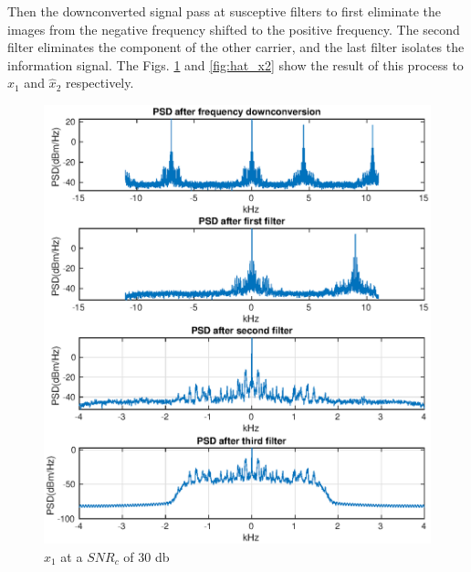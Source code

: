 \documentclass[
	12pt,				%
	openright,			%
	oneside,			%
	a4paper,			%
	chapter=TITLE,		%
	english,			%
	french,				%
	spanish,			%
	brazil				%
	]{abntex2}
\theoremstyle{definition}
\begin{document}
Then the downconverted signal pass at susceptive filters to first eliminate the images from the negative frequency shifted to the positive frequency. The second filter eliminates the component of the other carrier, and the last filter isolates the information signal. The Figs. \ref{fig:hat_x1} and \ref{fig:hat_x2} show the result of this process to $\hat{x}_1$ and $\hat{x}_2$ respectively.
\begin{figure}[h!]
	\centering
	\includegraphics{imagens/x1hat.eps}
	\caption{$\hat{x}_1$ at a $SNR_c$ of 30 db}
	\label{fig:hat_x1}
\end{figure}
\end{document}
